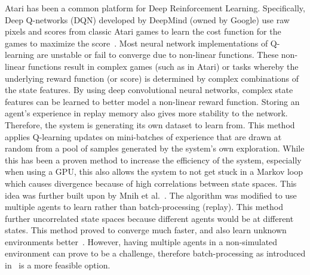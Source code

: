 \documentclass[12pt,american]{report}
\begin{document}
	Atari has been a common platform for Deep Reinforcement Learning. Specifically, Deep Q-networks (DQN) developed by DeepMind (owned by Google) use raw pixels and scores from classic Atari games to learn the cost function for the games to maximize the score~\cite{mnih2015human}. Most neural network implementations of Q-learning are unstable or fail to converge due to non-linear functions. These non-linear functions result in complex games (such as in Atari) or tasks whereby the underlying reward function (or score) is determined by complex combinations of the state features. By using deep convolutional neural networks, complex state features can be learned to better model a non-linear reward function. Storing an agent's experience in replay memory also gives more stability to the network. Therefore, the system is generating its own dataset to learn from. This method applies Q-learning updates on mini-batches of experience that are drawn at random from a pool of samples generated by the system's own exploration.  While this has been a proven method to increase the efficiency of the system, especially when using a GPU, this also allows the system to not get stuck in a Markov loop which causes divergence because of high correlations between state spaces.  This idea was further built upon by Mnih et al.~\cite{mnih2016asynchronous}. The algorithm was modified to use multiple agents to learn rather than batch-processing (replay). This method further uncorrelated state spaces because different agents would be at different states. This method proved to converge much faster, and also learn unknown environments better~\cite{mnih2016asynchronous}. However, having multiple agents in a non-simulated environment can prove to be a challenge, therefore batch-processing as introduced in~\cite{mnih2015human} is a more feasible option. 
	
\end{document}
